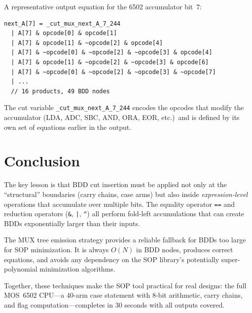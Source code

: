 \documentclass[11pt]{article}
\begin{document}
A representative output equation for the 6502 accumulator bit~7:

\begin{lstlisting}
next_A[7] = _cut_mux_next_A_7_244
  | A[7] & opcode[0] & opcode[1]
  | A[7] & opcode[1] & ~opcode[2] & opcode[4]
  | A[7] & ~opcode[0] & ~opcode[2] & ~opcode[3] & opcode[4]
  | A[7] & opcode[1] & ~opcode[2] & ~opcode[3] & opcode[6]
  | A[7] & ~opcode[0] & ~opcode[2] & ~opcode[3] & ~opcode[7]
  | ...
  // 16 products, 49 BDD nodes
\end{lstlisting}

The cut variable \texttt{\_cut\_mux\_next\_A\_7\_244} encodes the
opcodes that modify the accumulator (LDA, ADC, SBC, AND, ORA, EOR,
etc.)\ and is defined by its own set of equations earlier in the
output.

\section{Conclusion}

The key lesson is that BDD cut insertion must be applied not only at
the ``structural'' boundaries (carry chains, case arms) but also
inside \emph{expression-level} operations that accumulate over
multiple bits.  The equality operator \texttt{==} and reduction
operators (\texttt{\&}, \texttt{|}, \texttt{\^{}}) all perform
fold-left accumulations that can create BDDs exponentially larger than
their inputs.

The MUX tree emission strategy provides a reliable fallback for BDDs
too large for SOP minimization.  It is always $O(N)$ in BDD nodes,
produces correct equations, and avoids any dependency on the SOP
library's potentially super-polynomial minimization algorithms.

Together, these techniques make the SOP tool practical for real
designs: the full MOS~6502 CPU---a 40-arm case statement with 8-bit
arithmetic, carry chains, and flag computation---completes in 30
seconds with all outputs covered.
\end{document}
